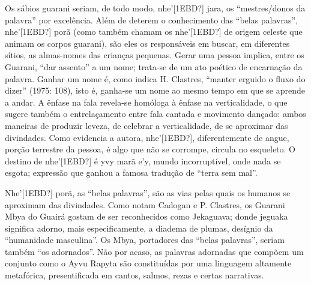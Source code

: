 \documentclass{article}
\begin{document}
Os s\'abios guarani seriam, de todo modo, nhe{\textquoteright}[1EBD?]
jara, os {\textquotedblleft}mestres/donos da
palavra{\textquotedblright} por excel\^encia. Al\'em de deterem o
conhecimento das {\textquotedblleft}belas palavras{\textquotedblright},
nhe{\textquoteright}[1EBD?] por\~a (como tamb\'em chamam os
nhe{\textquoteright}[1EBD?] de origem celeste que animam os corpos
guarani), s\~ao eles os respons\'aveis em buscar, em diferentes
s\'itios, as almas-nomes das crian\c{c}as pequenas. Gerar uma pessoa
implica, entre os Guarani, {\textquotedblleft}dar
assento{\textquotedblright} a um nome; trata-se de um ato po\'etico de
encarna\c{c}\~ao da palavra. Ganhar um nome \'e, como indica H.
Clastres, {\textquotedblleft}manter erguido o fluxo do
dizer{\textquotedblright} (1975: 108), isto \'e, ganha-se um nome ao
mesmo tempo em que se aprende a andar. A \^enfase na fala revela-se
hom\'ologa \`a \^enfase na verticalidade, o que sugere tamb\'em o
entrela\c{c}amento entre fala cantada e movimento dan\c{c}ado: ambos
maneiras de produzir leveza, de celebrar a verticalidade, de se
aproximar das divindades. Como evidencia a autora,
nhe{\textquoteright}[1EBD?], diferentemente de angue, por\c{c}\~ao
terrestre da pessoa, \'e algo que n\~ao se corrompe, circula no
esqueleto. O destino de nhe{\textquoteright}[1EBD?] \'e yvy mar\~a
e{\textquoteright}y, mundo incorrupt\'ivel, onde nada se esgota;
express\~ao que ganhou a famosa tradu\c{c}\~ao de
{\textquotedblleft}terra sem mal{\textquotedblright}.

Nhe{\textquoteright}[1EBD?] por\~a, as {\textquotedblleft}belas
palavras{\textquotedblright}, s\~ao as vias pelas quais os humanos se
aproximam das divindades. Como notam Cadogan e P. Clastres, os Guarani
Mbya do Guair\'a gostam de ser reconhecidos como Jekaguava; donde
jeguaka significa adorno, mais especificamente, a diadema de plumas,
des\'ignio da {\textquotedblleft}humanidade
masculina{\textquotedblright}. Os Mbya, portadores das
{\textquotedblleft}belas palavras{\textquotedblright}, seriam tamb\'em
{\textquotedblleft}os adornados{\textquotedblright}. N\~ao por acaso,
as palavras adornadas que comp\~oem um conjunto como o Ayvu Rapyta
s\~ao constitu\'idas por uma linguagem altamente metaf\'orica,
presentificada em cantos, salmos, rezas e certas narrativas. 
\end{document}
